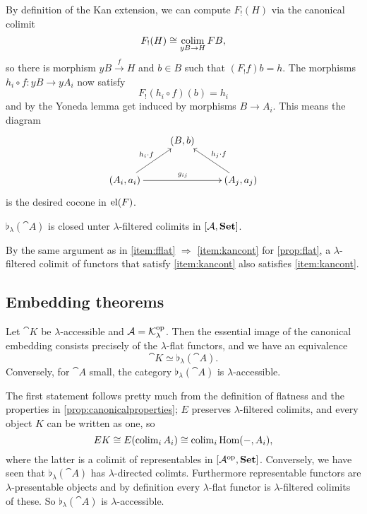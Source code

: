 \begin{Proof}
By definition of the Kan extension, we can compute $F_!(H)$ via the canonical colimit 
\[ F_!(H) \cong \operatorname*{colim}_{yB \to H} FB, \]
so there is morphism $yB \xrightarrow{f} H$ and $b \in B$ such that $(F_!f)b = h$. The morphisms $h_i\circ f : yB \to yA_i$ now satisfy
\[ F_!(h_i \circ f)(b) = h_i \]
and by the Yoneda lemma get induced by morphisms $B \to A_i$. This means the diagram
\[
\xymatrix{
& (B,b) & \\
(A_i,a_i) \ar[ru]^{h_i \circ f} \ar[rr]^{g_{ij}} & & (A_j,a_j) \ar[lu]_{h_j \circ f} 
}\]
is the desired cocone in $\textrm{el}(F)$.
\end{Proof}

\begin{Corollary}
$\flat_\lambda(\cat A)$ is closed unter $\lambda$-filtered colimits in $[\mathcal{A},\mathbf{Set}]$.
\end{Corollary}
\begin{Proof}
By the same argument as in \ref{item:fflat} $\Rightarrow$ \ref{item:kancont} for \ref{prop:flat}, a $\lambda$-filtered colimit of functors that satisfy \ref{item:kancont} also satisfies \ref{item:kancont}.
\end{Proof}

\subsection{Embedding theorems}

\begin{Proposition}
Let $\cat K$ be $\lambda$-accessible and $\mathcal{A} = \mathcal{K}^{\textrm{op}}_\lambda$. Then the essential image of the canonical embedding consists precisely of the $\lambda$-flat functors, and we have an equivalence
\[ \cat K \simeq \flat_\lambda(\cat A). \]
Conversely, for $\cat A$ small, the category $\flat_\lambda(\cat A)$ is $\lambda$-accessible.
\end{Proposition}
\begin{Proof}
The first statement follows pretty much from the definition of flatness and the properties in \ref{prop:canonicalproperties}; $E$ preserves $\lambda$-filtered colimits, and every object $K$ can be written as one, so
\[ EK \cong E(\operatorname{colim}_i A_i) \cong \operatorname{colim}_i \textrm{Hom}(-,A_i), \]
where the latter is a colimit of representables in $[\mathcal{A}^{\textrm{op}},\mathbf{Set}]$.
Conversely, we have seen that $\flat_\lambda(\cat A)$ has $\lambda$-directed colimts. Furthermore representable functors are $\lambda$-presentable objects and by definition every $\lambda$-flat functor is $\lambda$-filtered colimits of these. So $\flat_\lambda(\cat A)$ is $\lambda$-accessible.
\end{Proof}


